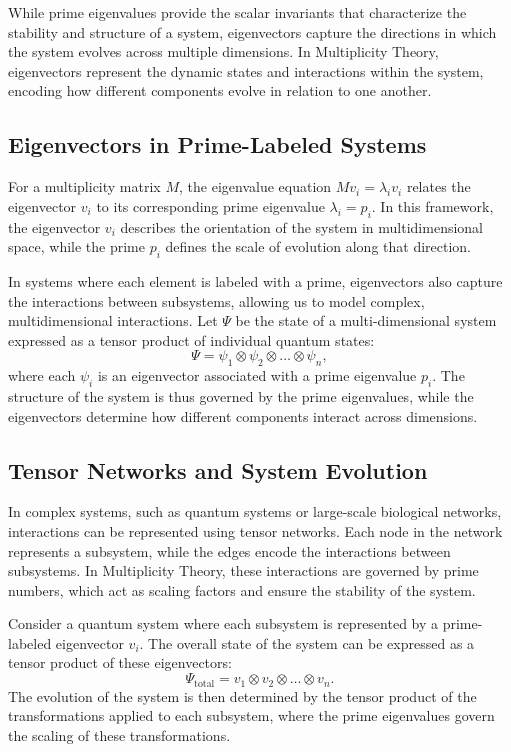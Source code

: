 \documentclass[%
 preprint, linenumbers,
 amsmath,amssymb,
 aps, physrev,
]{revtex4-2}
\begin{document}
While prime eigenvalues provide the scalar invariants that characterize the stability and structure of a system, eigenvectors capture the directions in which the system evolves across multiple dimensions. In Multiplicity Theory, eigenvectors represent the dynamic states and interactions within the system, encoding how different components evolve in relation to one another.

\subsection{Eigenvectors in Prime-Labeled Systems}

For a multiplicity matrix \( M \), the eigenvalue equation \( M v_i = \lambda_i v_i \) relates the eigenvector \( v_i \) to its corresponding prime eigenvalue \( \lambda_i = p_i \). In this framework, the eigenvector \( v_i \) describes the orientation of the system in multidimensional space, while the prime \( p_i \) defines the scale of evolution along that direction.

In systems where each element is labeled with a prime, eigenvectors also capture the interactions between subsystems, allowing us to model complex, multidimensional interactions. Let \( \Psi \) be the state of a multi-dimensional system expressed as a tensor product of individual quantum states:
\[
\Psi = \psi_1 \otimes \psi_2 \otimes \dots \otimes \psi_n,
\]
where each \( \psi_i \) is an eigenvector associated with a prime eigenvalue \( p_i \). The structure of the system is thus governed by the prime eigenvalues, while the eigenvectors determine how different components interact across dimensions.

\subsection{Tensor Networks and System Evolution}

In complex systems, such as quantum systems or large-scale biological networks, interactions can be represented using tensor networks. Each node in the network represents a subsystem, while the edges encode the interactions between subsystems. In Multiplicity Theory, these interactions are governed by prime numbers, which act as scaling factors and ensure the stability of the system.

Consider a quantum system where each subsystem is represented by a prime-labeled eigenvector \( v_i \). The overall state of the system can be expressed as a tensor product of these eigenvectors:
\[
\Psi_{\text{total}} = v_1 \otimes v_2 \otimes \dots \otimes v_n.
\]
The evolution of the system is then determined by the tensor product of the transformations applied to each subsystem, where the prime eigenvalues govern the scaling of these transformations.
\end{document}
